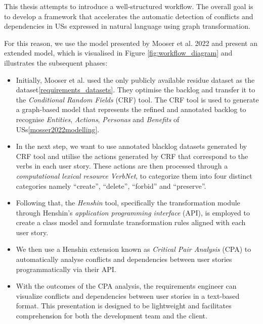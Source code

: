 This thesis attempts to introduce a well-structured workflow. The overall goal is to develop a framework that accelerates the automatic detection of conflicts and dependencies in USs expressed in natural language using graph transformation.

For this reason, we use the model presented by Mooser et al. 2022 and present an extended model, which is visualised in Figure \ref{fig:workflow_diagram} and illustrates the subsequent phases:
\begin{itemize}
\item Initially, Mooser et al. used the only publicly available residue dataset as the dataset\ref{requirements_datasets}. They optimise the backlog and transfer it to the \emph{Conditional Random Fields} (CRF) tool. The CRF tool is used to generate a graph-based model that represents the refined and annotated backlog to recognise \emph{Entities}, \emph{Actions}, \emph{Personas} and \emph{Benefits} of USs\ref{mosser2022modelling}.
\item In the next step, we want to use annotated blacklog datasets generated by CRF tool and utilise the actions generated by CRF that correspond to the verbs in each user story. These actions are then processed through a \emph{computational lexical resource} \emph{VerbNet}, to categorize them into four distinct categories namely \enquote{create}, \enquote{delete}, \enquote{forbid} and \enquote{preserve}.
\item Following that, the \emph{Henshin} tool, specifically the transformation module through Henshin's \emph{application programming interface} (API), is employed to create a class model and formulate transformation rules aligned with each user story.
\item We then use a Henshin extension known as \emph{Critical Pair Analysis} (CPA) to automatically analyse conflicts and dependencies between user stories programmatically via their API.
\item With the outcomes of the CPA analysis, the requirements engineer can visualize conflicts and dependencies between user stories in a text-based format. This presentation is designed to be lightweight and facilitates comprehension for both the development team and the client.
\end{itemize}
